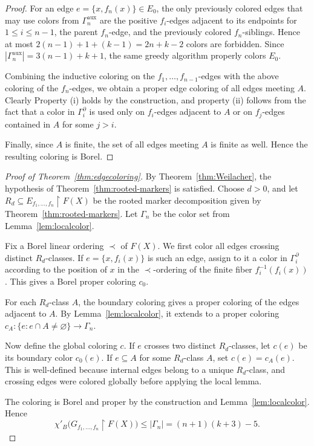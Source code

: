 \documentclass[11pt, reqno, a4paper]{amsart}
\theoremstyle{definition}
\theoremstyle{plain}
\begin{document}
\begin{proof}

For an edge $e=\{x,f_n(x)\}\in E_0$, the only previously colored
edges that may use colors from $\Gamma_n^{\mathrm{aux}}$ are the
positive $f_i$-edges adjacent to its endpoints for
$1\le i\le n-1$, the parent $f_n$-edge, and the previously colored
$f_n$-siblings. Hence at most
$
2(n-1)+1+(k-1)=2n+k-2
$
colors are forbidden. Since
$|\Gamma_n^{\mathrm{aux}}|=3(n-1)+k+1$, the same greedy algorithm
properly colors $E_0$.

Combining the inductive coloring on the $f_1,\dots,f_{n-1}$-edges with the above coloring of the $f_n$-edges, we obtain a proper edge coloring of all edges meeting $A$. Clearly Property \textup{(i)} holds by the construction, and property \textup{(ii)} follows from the fact that a color in $\Gamma_i^\partial$ is used only on $f_i$-edges adjacent to $A$ or on $f_{j}$-edges contained in $A$ for some $j>i$.

Finally, since $A$ is finite, the set of all edges meeting $A$ is finite as well. Hence the resulting coloring is Borel.
\end{proof}


\begin{proof}[Proof of Theorem~\ref{thm:edgecoloring}]
 By Theorem~\ref{thm:Weilacher}, the hypothesis of Theorem~\ref{thm:rooted-markers} is satisfied.  Choose $d>0$, and let
$R_d\subseteq E_{f_1,\ldots,f_n}\upharpoonright F(X)$
be the rooted marker decomposition given by Theorem~\ref{thm:rooted-markers}.
Let $\Gamma_n$ be the color set from Lemma~\ref{lem:localcolor}.

Fix a Borel linear ordering $\prec$ of $F(X)$. We first color all edges crossing
distinct $R_d$-classes. If $e=\{x,f_i(x)\}$ is such an edge, assign to it a
color in $\Gamma_i^\partial$ according to the position of $x$ in the $\prec$-ordering of the finite
fiber $f_i^{-1}(f_i(x))$. This gives a Borel proper coloring $c_0$.

For each $R_d$-class $A$, the boundary coloring gives a proper coloring of
the edges adjacent to $A$. By Lemma~\ref{lem:localcolor}, it extends to a
proper coloring
$c_A:\{e:e\cap A\neq\varnothing\}\to\Gamma_n$.

Now define the global coloring $c$. If $e$ crosses two distinct
$R_d$-classes, let $c(e)$ be its boundary color $c_0(e)$. If $e\subseteq A$ for
some $R_d$-class $A$, set
$c(e)=c_A(e)$.
This is well-defined because internal edges belong to a unique $R_d$-class,
and crossing edges were colored globally before applying the local lemma.

The coloring is Borel and proper by the construction and
Lemma~\ref{lem:localcolor}. Hence
$$
\chi'_B\bigl(G_{f_1,\ldots,f_n}\upharpoonright F(X)\bigr)
\le |\Gamma_n|
=(n+1)(k+3)-5.
$$
\end{proof}



\end{document}
